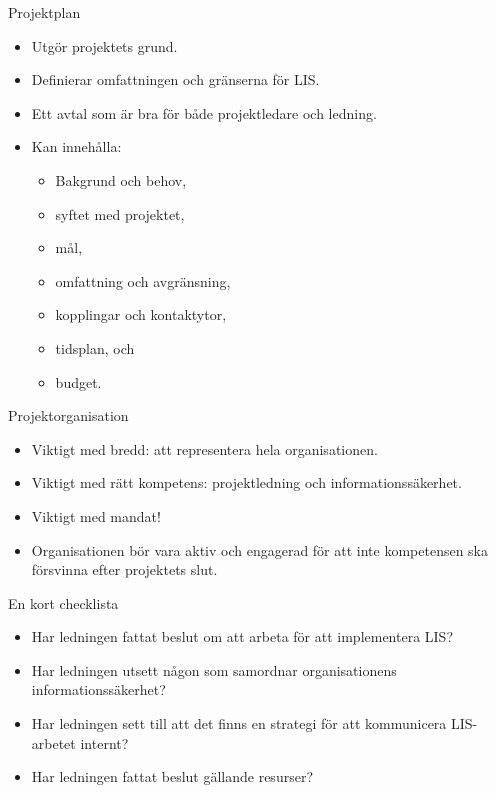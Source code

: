 \documentclass{beamer}
\begin{document}
\begin{frame}{Projektplan}
  \begin{itemize}
    \item Utgör projektets grund.
    \item Definierar omfattningen och gränserna för LIS\@.
    \item Ett avtal som är bra för både projektledare och ledning.
    \item Kan innehålla:
      \begin{itemize}
        \item Bakgrund och behov,
        \item syftet med projektet,
        \item mål,
        \item omfattning och avgränsning,
        \item kopplingar och kontaktytor,
        \item tidsplan, och
        \item budget.
      \end{itemize}
  \end{itemize}
\end{frame}

\begin{frame}{Projektorganisation}
  \begin{itemize}
    \item Viktigt med bredd: att representera hela organisationen.
    \item Viktigt med rätt kompetens: projektledning och informationssäkerhet.
    \item Viktigt med mandat!
    \item Organisationen bör vara aktiv och engagerad för att inte kompetensen 
      ska försvinna efter projektets slut.
  \end{itemize}
\end{frame}

\begin{frame}{En kort checklista}
  \begin{itemize}
    \item Har ledningen fattat beslut om att arbeta för att implementera LIS\@?
    \item Har ledningen utsett någon som samordnar organisationens 
      informationssäkerhet?
    \item Har ledningen sett till att det finns en strategi för att kommunicera 
      LIS-arbetet internt?
    \item Har ledningen fattat beslut gällande resurser?
  \end{itemize}
\end{frame}
\end{document}
